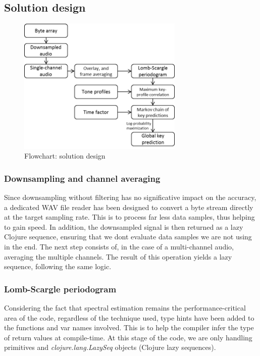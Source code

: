 \documentclass[letterpaper]{article}
\begin{document}
\subsection{Solution design}

\begin{figure}[h!]
\begin{center}
\includegraphics[width=3.1in,angle=0]{imgs/flowChart.png}
\caption{Flowchart: solution design}
\label{fig3}
\end{center}
\end{figure}

\subsubsection{Downsampling and channel averaging}

Since downsampling without filtering has no significative impact on the accuracy, a dedicated WAV file reader has been designed to convert a byte stream directly
at the target sampling rate. This is to process far less data samples, thus helping to gain speed. In addition, the downsampled signal is then returned as
a lazy Clojure sequence, ensuring that we don\textquotesingle t evaluate data samples we are not using in the end.
The next step consists of, in the case of a multi-channel audio, averaging the multiple channels. The result of this operation yields a lazy sequence, following
the same logic.

\subsubsection{Lomb-Scargle periodogram}

Considering the fact that spectral estimation remains the performance-critical area of the code, regardless of the technique used, type hints have been added to the functions and var names involved. This is to help the compiler infer the type of return values at compile-time.
At this stage of the code, we are only handling primitives and \textit{clojure.lang.LazySeq} objects (Clojure lazy sequences).\\
\end{document}
